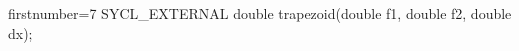 \begin{ccode*}{firstnumber=7}
SYCL_EXTERNAL double trapezoid(double f1, double f2, double dx);
\end{ccode*}
